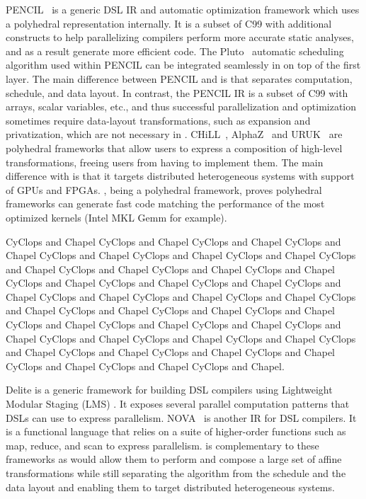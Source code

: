 PENCIL~\cite{pencil,pencil_paper} is a generic DSL IR and automatic optimization framework which uses a polyhedral representation internally.  It is a subset of C99 with additional constructs to help parallelizing compilers perform more accurate static analyses, and as a result generate more efficient code.  The Pluto~\cite{bondhugula_practical_2008} automatic scheduling algorithm used within PENCIL can be integrated seamlessly in \framework on top of the first layer.  The main difference between PENCIL and \framework is that \framework separates computation, schedule, and data layout.  In contrast, the PENCIL IR is a subset of C99 with arrays, scalar variables, etc., and thus successful parallelization and optimization sometimes require data-layout transformations, such as expansion and privatization, which are not necessary in \framework.
CHiLL~\cite{chill,Hall2010}, AlphaZ~\cite{yuki2012alphaz} and URUK~\cite{Girbal2006} are polyhedral frameworks that allow users to express a composition of high-level transformations, freeing users from having to implement them.  The main difference with \framework{} is that it targets distributed heterogeneous systems with support of GPUs and FPGAs.
\framework{}, being a polyhedral framework, proves polyhedral frameworks can generate fast code matching the performance of the most optimized kernels (Intel MKL Gemm for example).


CyClops and Chapel CyClops and Chapel CyClops and Chapel CyClops and Chapel CyClops and Chapel CyClops and Chapel CyClops and Chapel CyClops and Chapel CyClops and Chapel CyClops and Chapel CyClops and Chapel CyClops and Chapel CyClops and Chapel CyClops and Chapel CyClops and Chapel CyClops and Chapel CyClops and Chapel CyClops and Chapel CyClops and Chapel CyClops and Chapel CyClops and Chapel CyClops and Chapel CyClops and Chapel CyClops and Chapel CyClops and Chapel CyClops and Chapel CyClops and Chapel CyClops and Chapel CyClops and Chapel CyClops and Chapel CyClops and Chapel CyClops and Chapel CyClops and Chapel CyClops and Chapel CyClops and Chapel CyClops and Chapel.


Delite \cite{chafi_domain-specific_2011} is a generic
framework for building DSL compilers using Lightweight Modular Staging (LMS) \cite{lms_staging_10}. It exposes several parallel computation patterns that DSLs can use to express parallelism.
NOVA~\cite{Collins:2014:NFL:2627373.2627375} is another IR for DSL compilers. It is a functional language that relies on a suite of higher-order functions such as map, reduce, and scan to express parallelism.
\framework{} is complementary to these frameworks as \framework{} would allow them to perform and compose a large set of affine transformations while still separating the algorithm from the schedule and the data layout and enabling them to target distributed heterogeneous systems.

